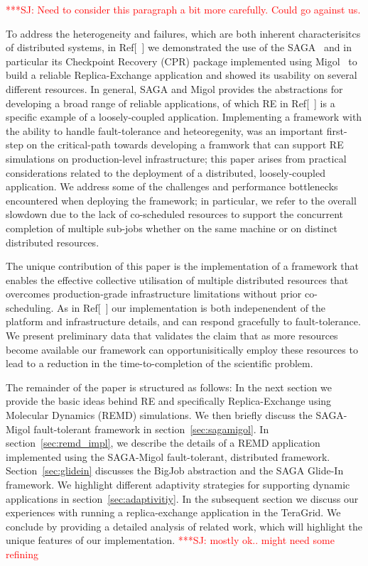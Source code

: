 \documentclass{rspublic}
\newcommand{\jhanote}[1]{ {\textcolor{red} { ***SJ: #1 }}}
\newcommand{\jhanote}[1]{}
\begin{document}
\jhanote{Need to consider this paragraph a bit more carefully. Could
  go against us.}         

To address the heterogeneity and failures, which are both inherent
characterisitcs of distributed systems, in Ref[~\citet{Luckow:2008la}]
we demonstrated the use of the SAGA~\citep{saga_gfd90} and in
particular its Checkpoint Recovery (CPR) package implemented using
Migol~\citep{schnorLuckow08} to build a reliable Replica-Exchange
application and showed its usability on several different resources.
In general, SAGA and Migol provides the abstractions for developing a
broad range of reliable applications, of which RE in
Ref[~\citet{Luckow:2008la}] is a specific example of a loosely-coupled
application. Implementing a framework with the ability to handle
fault-tolerance and heteoregenity, was an important first-step on the
critical-path towards developing a framwork that can support RE
simulations on production-level infrastructure; this paper arises from
practical considerations related to the deployment of a distributed,
loosely-coupled application.  We address some of the challenges and
performance bottlenecks encountered when deploying the framework; in
particular, we refer to the overall slowdown due to the lack of
co-scheduled resources to support the concurrent completion of
multiple sub-jobs whether on the same machine or on distinct
distributed resources.

The unique contribution of this paper is the implementation of a
framework that enables the effective collective utilisation of
multiple distributed resources that overcomes production-grade
infrastructure limitations without prior co-scheduling.  As in
Ref[~\citet{Luckow:2008la}] our implementation is both indepenendent
of the platform and infrastructure details, and can respond gracefully
to fault-tolerance.  We present preliminary data that validates the
claim that as more resources become available our framework can
opportunisitically employ these resources to lead to a reduction in
the time-to-completion of the scientific problem.

The remainder of the paper is structured as follows: In the next
section we provide the basic ideas behind RE and specifically
Replica-Exchange using Molecular Dynamics (REMD) simulations.  We then
briefly discuss the SAGA-Migol fault-tolerant framework in
section~\ref{sec:sagamigol}.  In section~\ref{sec:remd_impl}, we
describe the details of a REMD application implemented using the
SAGA-Migol fault-tolerant, distributed
framework. Section~\ref{sec:glidein} discusses the BigJob abstraction
and the SAGA Glide-In framework. We highlight different adaptivity
strategies for supporting dynamic applications in
section~\ref{sec:adaptivitiy}.  In the subsequent section we discuss
our experiences with running a replica-exchange application in the
TeraGrid.  We conclude by providing a detailed analysis of related
work, which will highlight the unique features of our implementation.
\jhanote{mostly ok.. might need some refining}
\end{document}
